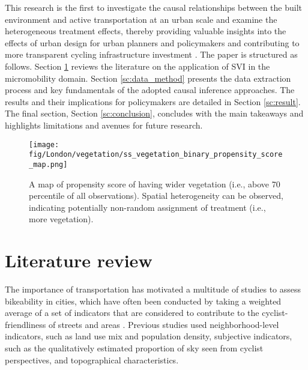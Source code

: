 \documentclass[preprint,12pt, authoryear]{elsarticle}
\begin{document}
This research is the first to investigate the causal relationships between the built environment and active transportation at an urban scale and examine the heterogeneous treatment effects, thereby providing valuable insights into the effects of urban design for urban planners and policymakers and contributing to more transparent cycling infrastructure investment \citep{meng_political_2022}. The paper is structured as follows. Section \ref{sc:lit_review} reviews the literature on the application of SVI in the micromobility domain. Section \ref{sc:data_method} presents the data extraction process and key fundamentals of the adopted causal inference approaches. The results and their implications for policymakers are detailed in Section \ref{sc:result}. The final section, Section \ref{sc:conclusion}, concludes with the main takeaways and highlights limitations and avenues for future research.

\begin{figure}
    \centering
    \texttt{[image: fig/London/vegetation/ss\_vegetation\_binary\_propensity\_score\_map.png]}
    \caption{A map of propensity score of having wider vegetation (i.e., above 70 percentile of all observations). Spatial heterogeneity can be observed, indicating potentially non-random assignment of treatment (i.e., more vegetation).}
    \label{intro:fig:propensity}
\end{figure}


\section{Literature review}  \label{sc:lit_review}
The importance of transportation has motivated a multitude of studies to assess bikeability in cities, which have often been conducted by taking a weighted average of a set of indicators that are considered to contribute to the cyclist-friendliness of streets and areas \citep{frank_development_2010, ewing_measuring_2009, duncan_validation_2011, wysling_where_2022, hosford_15minute_2022, codina_built_2022, bao_understanding_2023}. 
Previous studies used neighborhood-level indicators, such as land use mix and population density, subjective indicators, such as the qualitatively estimated proportion of sky seen from cyclist perspectives, and topographical characteristics. 
\end{document}
